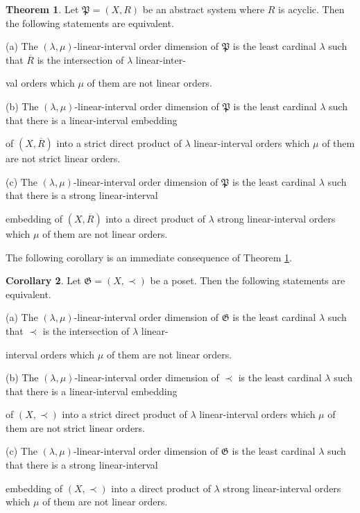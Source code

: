 \documentclass{article}
\theoremstyle{definition}
\newtheorem{theorem}{Theorem}[section]
\newtheorem{corollary}[theorem]{Corollary}
\begin{document}
\begin{theorem}\label{aw128} Let $\mathfrak{P}=(X,R)$ be an abstract system where $R$ is acyclic. Then the following statements are equivalent.
\par\noindent
(a) The $(\lambda,\mu)$-linear-interval order dimension of $\mathfrak{P}$ is the least cardinal $\lambda$ such that $\overline{R}$ is the intersection of $\lambda$ linear-inter-
\par
\!\!\! \!\!
val orders which $\mu$ of them are not linear orders.
\par\noindent
(b) The $(\lambda,\mu)$-linear-interval order dimension of $\mathfrak{P}$
is the least cardinal $\lambda$ such that there is a linear-interval embedding 
\par
\!\!\! \!\!
of $(X,\overline{R})$ into a strict direct product of $\lambda$ linear-interval orders
which $\mu$ of them are not strict linear orders.
\par\noindent
(c) The $(\lambda,\mu)$-linear-interval order dimension of $\mathfrak{P}$
is the least cardinal $\lambda$ such that there is a strong linear-interval 
\par
\!\!\! \!\!
embedding of $(X,\overline{R})$ into a direct product of $\lambda$ strong linear-interval orders which $\mu$ of them are not linear
orders.
\end{theorem}











The following corollary is an immediate consequence of Theorem \ref{aw128}.






\begin{corollary}\label{wxa128} Let $\mathfrak{G}=(X,\prec)$ be a poset. Then the following statements are equivalent.
\par\noindent
(a) The $(\lambda,\mu)$-linear-interval order dimension of $\mathfrak{G}$ is the least cardinal $\lambda$ such that $\prec$ is the intersection of $\lambda$ linear-
\par
\!\!\! \!\!
interval orders which $\mu$ of them are not linear orders.
\par\noindent
(b) The $(\lambda,\mu)$-linear-interval order dimension of $\prec$
is the least cardinal $\lambda$ such that there is a linear-interval embedding 
\par
\!\!\! \!\!
of $(X,\prec)$ into a strict direct product of $\lambda$ linear-interval orders
which $\mu$ of them are not strict linear orders.
\par\noindent
(c) The $(\lambda,\mu)$-linear-interval order dimension of $\mathfrak{G}$
is the least cardinal $\lambda$ such that there is a strong linear-interval 
\par
\!\!\! \!\!
embedding of $(X,\prec)$ into a direct product of $\lambda$ strong linear-interval orders which $\mu$ of them are not linear
orders.
\end{corollary}
\end{document}
